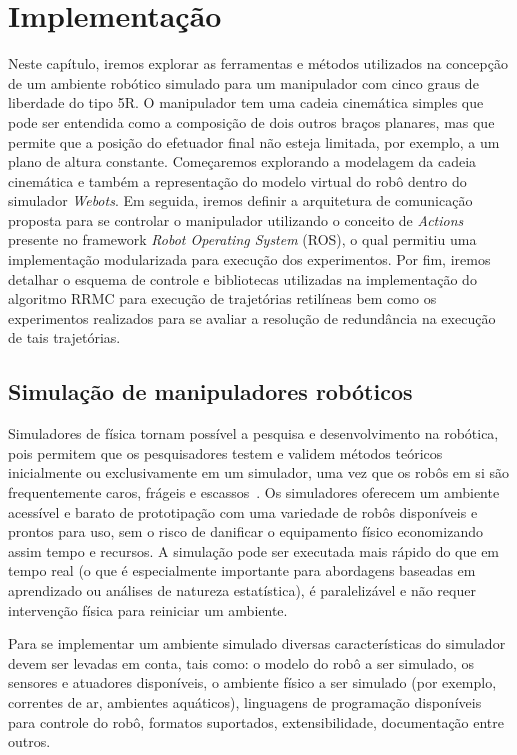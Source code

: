 \chapter{Implementação}\label{cap:methods}

Neste capítulo, iremos explorar as ferramentas e métodos utilizados na
concepção de um ambiente robótico simulado para um manipulador com cinco graus
de liberdade do tipo 5R. O manipulador tem uma cadeia cinemática simples que
pode ser entendida como a composição de dois outros braços planares, mas que
permite que a posição do efetuador final não esteja limitada, por exemplo, a um
plano de altura constante. Começaremos explorando a modelagem da cadeia
cinemática e também a representação do modelo virtual do robô dentro do
simulador \emph{Webots}. Em seguida, iremos definir a arquitetura de
comunicação proposta para se controlar o manipulador utilizando o conceito de
\emph{Actions} presente no framework \emph{Robot Operating System} (ROS), o
qual permitiu uma implementação modularizada para execução dos experimentos.
Por fim, iremos detalhar o esquema de controle e bibliotecas utilizadas na
implementação do algoritmo RRMC para execução de trajetórias retilíneas bem como os 
experimentos realizados para se avaliar a resolução de redundância na execução de 
tais trajetórias.

\section{Simulação de manipuladores robóticos}

Simuladores de física tornam possível a pesquisa e desenvolvimento na robótica,
pois permitem que os pesquisadores testem e validem métodos teóricos
inicialmente ou exclusivamente em um simulador, uma vez que os robôs em si são
frequentemente caros, frágeis e escassos~\cite{robotic_applications}. Os
simuladores oferecem um ambiente acessível e barato de prototipação com uma
variedade de robôs disponíveis e prontos para uso, sem o risco de danificar o
equipamento físico economizando assim tempo e recursos. A simulação pode ser
executada mais rápido do que em tempo real (o que é especialmente importante
para abordagens baseadas em aprendizado ou análises de natureza estatística), é
paralelizável e não requer intervenção física para reiniciar um ambiente.

Para se implementar um ambiente simulado diversas características do simulador
devem ser levadas em conta, tais como: o modelo do robô a ser simulado, os
sensores e atuadores disponíveis, o ambiente físico a ser simulado (por
exemplo, correntes de ar, ambientes aquáticos), linguagens de programação
disponíveis para controle do robô, formatos suportados, extensibilidade,
documentação entre outros.

